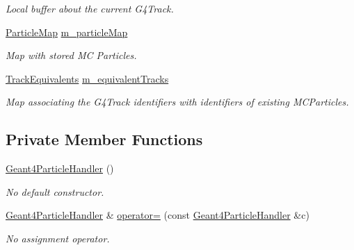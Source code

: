 \begin{DoxyCompactItemize}
\begin{DoxyCompactList}\small\item\em Local buffer about the \textquotesingle{}current\textquotesingle{} G4\+Track. \end{DoxyCompactList}\item 
\hyperlink{class_d_d4hep_1_1_simulation_1_1_geant4_particle_handler_a79cf5fe4ceb492dff4d3458306a08973}{Particle\+Map} \hyperlink{class_d_d4hep_1_1_simulation_1_1_geant4_particle_handler_a9f1973d25638be1fbfad9166a681d765}{m\+\_\+particle\+Map}
\begin{DoxyCompactList}\small\item\em Map with stored MC Particles. \end{DoxyCompactList}\item 
\hyperlink{class_d_d4hep_1_1_simulation_1_1_geant4_particle_handler_a6163ec58bca837bb4544fd6e2f4bc05a}{Track\+Equivalents} \hyperlink{class_d_d4hep_1_1_simulation_1_1_geant4_particle_handler_a5978fee684baca7e2e04931783440122}{m\+\_\+equivalent\+Tracks}
\begin{DoxyCompactList}\small\item\em Map associating the G4\+Track identifiers with identifiers of existing M\+C\+Particles. \end{DoxyCompactList}\end{DoxyCompactItemize}
\subsection*{Private Member Functions}
\begin{DoxyCompactItemize}
\item 
\hyperlink{class_d_d4hep_1_1_simulation_1_1_geant4_particle_handler_a0de98b6650d1787bf26b6b959bc7e502}{Geant4\+Particle\+Handler} ()
\begin{DoxyCompactList}\small\item\em No default constructor. \end{DoxyCompactList}\item 
\hyperlink{class_d_d4hep_1_1_simulation_1_1_geant4_particle_handler}{Geant4\+Particle\+Handler} \& \hyperlink{class_d_d4hep_1_1_simulation_1_1_geant4_particle_handler_a880488dc828d7e3a38a4332347608fc2}{operator=} (const \hyperlink{class_d_d4hep_1_1_simulation_1_1_geant4_particle_handler}{Geant4\+Particle\+Handler} \&c)
\begin{DoxyCompactList}\small\item\em No assignment operator. \end{DoxyCompactList}\end{DoxyCompactItemize}


